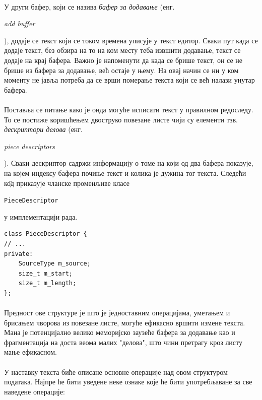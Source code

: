 \documentclass[12pt,oneside]{memoir}
\begin{document}
\paragraph{}
У други бафер, који се назива \emph{бафер за додавање} 
(енг. \begin{latinica}\textit{add buffer}\end{latinica}), 
додаје се текст који се током времена уписује у текст едитор. Сваки пут
када се додаје текст, без обзира на то на ком месту теба извшити додавање, 
текст се додаје на крај бафера. Важно је напоменути да када се брише текст, он се не 
брише из бафера за додавање, већ остаје у њему. На овај начин се ни у ком моменту не 
јавља потреба да се врши померање текста који се већ налази унутар бафера.

\paragraph{}
Поставља се питање како је онда могуће исписати текст у правилном редоследу. То се постиже
коришћењем двоструко повезане листе чији су елементи тзв. \emph{дескриптори делова} (енг. \begin{latinica}\textit{piece descriptors}\end{latinica}). Сваки дескриптор садржи
информацију о томе на који од два бафера показује, на којем индексу бафера почиње текст и
колика је дужина тог текста. Следећи к\^{о}д приказује чланске променљиве класе \begin{latinica}\verb|PieceDescriptor|\end{latinica} у имплементацији рада.

\begin{verbatim}
class PieceDescriptor {
// ...
private:
    SourceType m_source;
    size_t m_start;
    size_t m_length;
};
\end{verbatim}

\paragraph{}
Предност ове структуре је што је једноставним операцијама, уметањем и брисањем чворова из
повезане листе, могуће ефикасно вршити измене текста. Мана је потенцијално велико меморијско заузеће бафера за додавање као и фрагментација на доста веома малих "делова",
што чини претрагу кроз листу мање ефикасном.

\paragraph{}
У наставку текста биће описане основне операције над овом структуром података. Најпре
ће бити уведене неке ознаке које ће бити употребљаване за све наведене операције:
\end{document}
